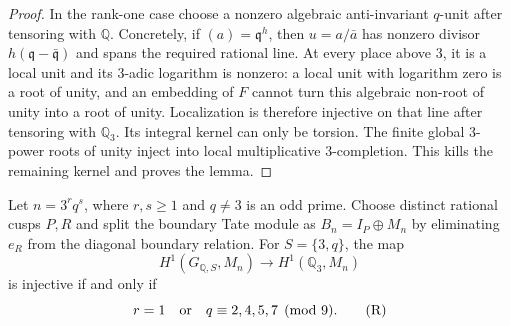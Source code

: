 \begin{proof}
In the rank-one case choose a nonzero algebraic anti-invariant
$q$-unit after tensoring with $\mathbb Q$.  Concretely, if
$(a)=\mathfrak q^h$, then $u=a/\bar a$ has nonzero divisor
$h(\mathfrak q-\bar{\mathfrak q})$ and spans the required rational
line.  At every place above $3$, it is a local unit and its $3$-adic
logarithm is nonzero: a local unit with logarithm zero is a root of
unity, and an embedding of $F$ cannot turn this algebraic non-root
of unity into a root of unity.  Localization is therefore injective
on that line after tensoring with $\mathbb Q_3$.  Its integral kernel
can only be torsion.  The finite global $3$-power roots of unity inject
into local multiplicative $3$-completion.  This kills the remaining
kernel and proves the lemma.
\end{proof}

\begin{proposition}
\label{prop:root-real-boundary-range}
Let $n=3^r q^s$, where $r,s\ge1$ and $q\ne3$ is an odd prime.
Choose distinct rational cusps $P,R$ and split the boundary Tate module
as $B_n=I_P\oplus M_n$ by eliminating $e_R$ from the diagonal boundary
relation. For $S=\{3,q\}$, the map
\[
 H^1(G_{\mathbb Q,S},M_n)\longrightarrow H^1(\mathbb Q_3,M_n)
\]
is injective if and only if
\[
 r=1\quad\hbox{or}\quad q\equiv2,4,5,7\pmod9.
 \tag{R}\label{eq:root-real-prime-condition}
\]
\end{proposition}
